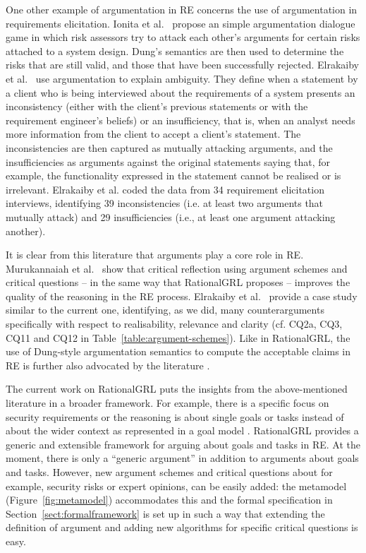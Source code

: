One other example of argumentation in RE concerns the use of argumentation in requirements elicitation. Ionita et al.~\cite{ionita2014argumentation} propose an simple argumentation dialogue game in which risk assessors try to attack each other's arguments for certain risks attached to a system design. Dung's semantics \cite{Dung1995} are then used to determine the risks that are still valid, and those that have been successfully rejected. Elrakaiby et al.~\cite{ElrakaibyFSGN17} use argumentation to explain ambiguity. They define when a statement by a client who is being interviewed about the requirements of a system presents an inconsistency (either with the client's previous statements or with the requirement engineer's beliefs) or an insufficiency, that is, when an analyst needs more information from the client to accept a client's statement. The inconsistencies are then captured as mutually attacking arguments, and the insufficiencies as arguments against the original statements saying that, for example, the functionality expressed in the statement cannot be realised or is irrelevant. Elrakaiby et al. coded the data from 34 requirement elicitation interviews, identifying 39 inconsistencies (i.e. at least two arguments that mutually attack) and 29 insufficiencies (i.e., at least one argument attacking another).

It is clear from this literature that arguments play a core role in RE. Murukannaiah et al.~\cite{murukannaiah2015} show that critical reflection using argument schemes and critical questions -- in the same way that RationalGRL proposes -- improves the quality of the reasoning in the RE process. Elrakaiby et al.~\cite{ElrakaibyFSGN17} provide a case study similar to the current one, identifying, as we did, many counterarguments specifically with respect to realisability, relevance and clarity (cf. CQ2a, CQ3, CQ11 and CQ12 in Table~\ref{table:argument-schemes}). Like in RationalGRL, the use of Dung-style argumentation semantics to compute the acceptable claims in RE is further also advocated by the literature \cite{yu2015automated,ionita2014argumentation,ElrakaibyFSGN17}. 

The current work on RationalGRL puts the insights from the above-mentioned literature in a broader framework. For example, there is a specific focus on security requirements \cite{haley2008security,yu2015automated,ionita2014argumentation} or the reasoning is about single goals or tasks instead of about the wider context as represented in a goal model \cite{haley2008security,yu2015automated,murukannaiah2015,ElrakaibyFSGN17}. RationalGRL provides a generic and extensible framework for arguing about goals and tasks in RE. At the moment, there is only a ``generic argument'' in addition to arguments about goals and tasks. However, new argument schemes and critical questions about for example, security risks or expert opinions, can be easily added: the metamodel (Figure~\ref{fig:metamodel}) accommodates this and the formal specification in Section~\ref{sect:formalframework} is set up in such a way that extending the definition of argument and adding new algorithms for specific critical questions is easy. 


